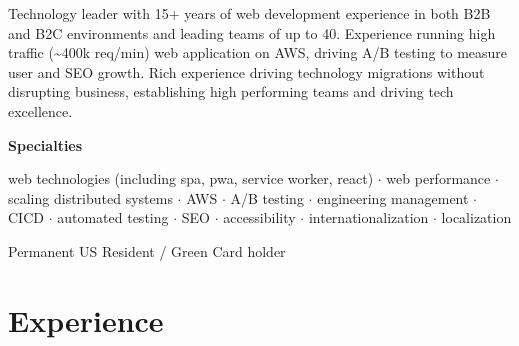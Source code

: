 \documentclass[11pt,a4paper,roman]{moderncv}       %
\begin{document}
\makecvtitle

\small{Technology leader with 15+ years of web development experience in both B2B and B2C environments and leading teams of up to 40. Experience running high traffic (\textasciitilde400k req/min) web application on AWS, driving A/B testing to measure user and SEO growth. Rich experience driving technology migrations without disrupting business, establishing high performing teams and driving tech excellence.}

\bigskip

\small{\textbf{Specialties} 
\begin{center}
web technologies (including spa, pwa, service worker, react) ${\cdot}$ web performance ${\cdot}$ scaling distributed systems ${\cdot}$ AWS ${\cdot}$ A/B testing ${\cdot}$ engineering management ${\cdot}$  CICD ${\cdot}$ automated testing ${\cdot}$ SEO ${\cdot}$ accessibility ${\cdot}$ internationalization ${\cdot}$ localization  
\end{center}
\bigskip

Permanent US Resident / Green Card holder


\section{Experience}


}
\end{document}
